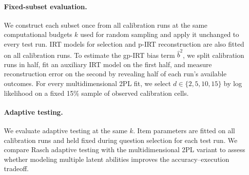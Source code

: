 \paragraph{Fixed-subset evaluation.}
We construct each subset once from all calibration runs at the same computational budgets $k$ used for random sampling and apply it unchanged to every test run. IRT models for selection and
p-IRT reconstruction are also fitted on all calibration runs. To estimate the
gp-IRT bias term $\hat{b}^2$, we split calibration runs in half, fit an auxiliary
IRT model on the first half, and measure reconstruction error on the second by
revealing half of each run’s available outcomes. For every multidimensional 2PL
fit, we select $d\in\{2,5,10,15\}$ by log likelihood on a fixed 15\% sample of
observed calibration cells.


\paragraph{Adaptive testing.}
We evaluate adaptive testing at the same $k$. Item parameters are fitted on all calibration runs and held fixed during
question selection for each test run. We compare Rasch adaptive testing with the multidimensional 2PL
variant to assess whether modeling multiple latent abilities improves the
accuracy--execution tradeoff.
